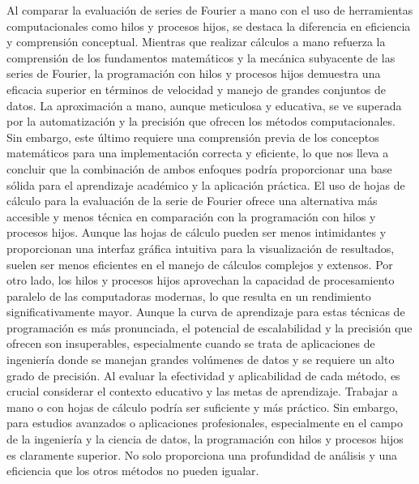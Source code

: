 Al comparar la evaluación de series de Fourier a mano con el uso de herramientas computacionales como hilos y procesos hijos, se destaca la diferencia en eficiencia y comprensión conceptual. Mientras que realizar cálculos a mano refuerza la comprensión de los fundamentos matemáticos y la mecánica subyacente de las series de Fourier, la programación con hilos y procesos hijos demuestra una eficacia superior en términos de velocidad y manejo de grandes conjuntos de datos. La aproximación a mano, aunque meticulosa y educativa, se ve superada por la automatización y la precisión que ofrecen los métodos computacionales. Sin embargo, este último requiere una comprensión previa de los conceptos matemáticos para una implementación correcta y eficiente, lo que nos lleva a concluir que la combinación de ambos enfoques podría proporcionar una base sólida para el aprendizaje académico y la aplicación práctica. El uso de hojas de cálculo para la evaluación de la serie de Fourier ofrece una alternativa más accesible y menos técnica en comparación con la programación con hilos y procesos hijos. Aunque las hojas de cálculo pueden ser menos intimidantes y proporcionan una interfaz gráfica intuitiva para la visualización de resultados, suelen ser menos eficientes en el manejo de cálculos complejos y extensos. Por otro lado, los hilos y procesos hijos aprovechan la capacidad de procesamiento paralelo de las computadoras modernas, lo que resulta en un rendimiento significativamente mayor. Aunque la curva de aprendizaje para estas técnicas de programación es más pronunciada, el potencial de escalabilidad y la precisión que ofrecen son insuperables, especialmente cuando se trata de aplicaciones de ingeniería donde se manejan grandes volúmenes de datos y se requiere un alto grado de precisión. Al evaluar la efectividad y aplicabilidad de cada método, es crucial considerar el contexto educativo y las metas de aprendizaje. Trabajar a mano o con hojas de cálculo podría ser suficiente y más práctico. Sin embargo, para estudios avanzados o aplicaciones profesionales, especialmente en el campo de la ingeniería y la ciencia de datos, la programación con hilos y procesos hijos es claramente superior. No solo proporciona una profundidad de análisis y una eficiencia que los otros métodos no pueden igualar.


